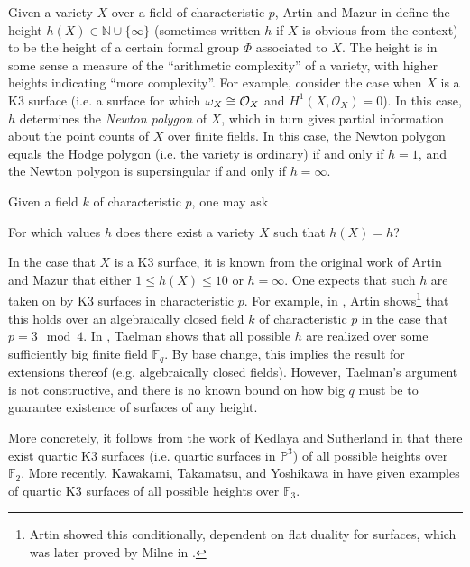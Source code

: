 Given a variety \(X\) over a field of characteristic \(p\),
Artin and Mazur in \cite{artin-mazur-1977-height}
define the height \(h(X) \in \mathbb{N} \cup \{\infty\}\) 
(sometimes written \(h\) if \(X\) is obvious from the context)
to be the height 
of a certain formal group \(\Phi\) associated to \(X\).
The height is in some sense a measure of the
``arithmetic complexity'' of a variety,
with higher heights indicating ``more complexity''.
For example, consider the case when \(X\) is a 
K3 surface (i.e. a surface for which \(\omega_{X} \cong \mathcal{O}_{X} \) 
and \(H^{1}(X,\mathcal{O}_{X} ) = 0\)).
In this case, \(h\) determines the \textit{Newton polygon}
of \(X\), which in turn gives partial information about the 
point counts of \(X\) over finite fields.
In this case, the Newton polygon equals the Hodge polygon
(i.e. the variety is ordinary) if and only if \(h=1\),
and the Newton polygon is supersingular if and only if 
\(h = \infty\).

Given a field \(k\) of characteristic \(p\), one may ask

\begin{quest}
    For which values \(h\) does there exist a variety
    \(X\) such that \(h(X) = h\)?
\end{quest}

In the case that \(X\) is a K3 surface, it is known from the 
original work of Artin and Mazur
that either \(1 \leq h(X) \leq 10\) or \(h = \infty\).
One expects that such $h$ are taken on by K3 surfaces
in characteristic $p$.
For example, in \cite{artin-1974-k3-surfaces},
Artin shows\footnote{
    Artin showed this conditionally, dependent on flat
    duality for surfaces, which was later proved
    by Milne in \cite{milne-1976-flat-duality}.
}
that this holds over an algebraically
closed field \(k\) of characteristic \(p\) in the
case that \(p = 3 \mod 4\).
In \cite{taelman-2016-k3-given-l-function}, 
Taelman shows that
all possible \(h\) are realized
over some sufficiently big finite field \(\mathbb{F}_{q}\). 
By base change, this implies the result for extensions
thereof (e.g. algebraically closed fields).
However, Taelman's argument is not constructive,
and there is no known bound on how big \(q\) must be to guarantee
existence of surfaces of any height.

More concretely, it follows from the work of
Kedlaya and Sutherland in 
\cite{kedlaya-sutherland-2016-census-k3-f2}
that there exist quartic K3 surfaces
(i.e. quartic surfaces in \(\mathbb{P}^{3}\))
of all possible heights over \(\mathbb{F}_{2}\).
More recently,
Kawakami, Takamatsu, and Yoshikawa in \cite{kty-2022-fedder}
have given examples of quartic K3 surfaces
of all possible heights over \(\mathbb{F}_{3}\).

